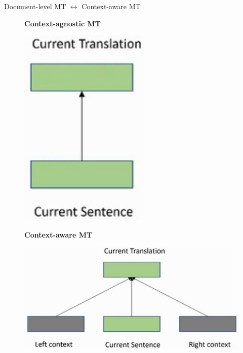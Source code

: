 \begin{frame}{Document-level MT $\leftrightarrow$ Context-aware MT}
	\begin{figure}
	\centering
	\begin{minipage}{.4\textwidth}
		\centering
		\textbf{Context-agnostic MT}\par\medskip
		\includegraphics[width=.4\linewidth]{Images/dlmt}
	\end{minipage}%
	\begin{minipage}{.6\textwidth}
		\centering
		\textbf{Context-aware MT}\par\medskip
		\includegraphics[width=.85\linewidth]{Images/slmt}
	\end{minipage}
	\end{figure}	
\end{frame}

